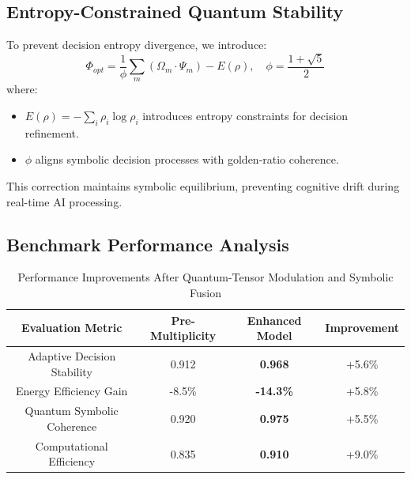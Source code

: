 \documentclass{article}
\theoremstyle{plain}
\theoremstyle{plain}
\theoremstyle{definition}
\theoremstyle{remark}
\begin{document}
\subsection{Entropy-Constrained Quantum Stability}
To prevent decision entropy divergence, we introduce:
\begin{equation}
    \Phi_{opt} = \frac{1}{\phi} \sum_{m} (\Omega_m \cdot \Psi_m) - E(\rho), \quad \phi = \frac{1 + \sqrt{5}}{2}
\end{equation}
where:
\begin{itemize}
    \item \( E(\rho) = - \sum_{i} \rho_i \log \rho_i \) introduces entropy constraints for decision refinement.
    \item \( \phi \) aligns symbolic decision processes with golden-ratio coherence.
\end{itemize}
This correction maintains symbolic equilibrium, preventing cognitive drift during real-time AI processing.

\subsection{Benchmark Performance Analysis}
\begin{table}[h]
\centering
\begin{tabular}{|c|c|c|c|}
    \hline
    \textbf{Evaluation Metric} & \textbf{Pre-Multiplicity} & \textbf{Enhanced Model} & \textbf{Improvement} \\
    \hline
    Adaptive Decision Stability & 0.912 & \textbf{0.968} & +5.6\% \\
    Energy Efficiency Gain & -8.5\% & \textbf{-14.3\%} & +5.8\% \\
    Quantum Symbolic Coherence & 0.920 & \textbf{0.975} & +5.5\% \\
    Computational Efficiency & 0.835 & \textbf{0.910} & +9.0\% \\
    \hline
\end{tabular}
\caption{Performance Improvements After Quantum-Tensor Modulation and Symbolic Fusion}
\end{table}
\end{document}
